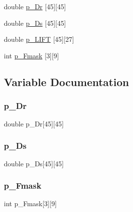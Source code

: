 \begin{DoxyCompactItemize}
\item 
double \hyperlink{a00527_ae0be71ad819a441ab63ef6b252636505}{p\+\_\+\+Dr} \mbox{[}45\mbox{]}\mbox{[}45\mbox{]}
\item 
double \hyperlink{a00527_ae312a6360ef346b6cbd9f0927ebb9d34}{p\+\_\+\+Ds} \mbox{[}45\mbox{]}\mbox{[}45\mbox{]}
\item 
double \hyperlink{a00527_a0609d63c7dafb5ca9a499d29cea08ea9}{p\+\_\+\+L\+I\+FT} \mbox{[}45\mbox{]}\mbox{[}27\mbox{]}
\item 
int \hyperlink{a00527_a2804c3bd05e4db2eedde3556a1d22bb6}{p\+\_\+\+Fmask} \mbox{[}3\mbox{]}\mbox{[}9\mbox{]}
\end{DoxyCompactItemize}


\subsection{Variable Documentation}
\mbox{\label{a00527_ae0be71ad819a441ab63ef6b252636505}} 
\subsubsection{\texorpdfstring{p\+\_\+\+Dr}{p\_Dr}}
{\footnotesize\ttfamily double p\+\_\+\+Dr\mbox{[}45\mbox{]}\mbox{[}45\mbox{]}}

\mbox{\label{a00527_ae312a6360ef346b6cbd9f0927ebb9d34}} 
\subsubsection{\texorpdfstring{p\+\_\+\+Ds}{p\_Ds}}
{\footnotesize\ttfamily double p\+\_\+\+Ds\mbox{[}45\mbox{]}\mbox{[}45\mbox{]}}

\mbox{\label{a00527_a2804c3bd05e4db2eedde3556a1d22bb6}} 
\subsubsection{\texorpdfstring{p\+\_\+\+Fmask}{p\_Fmask}}
{\footnotesize\ttfamily int p\+\_\+\+Fmask\mbox{[}3\mbox{]}\mbox{[}9\mbox{]}}

